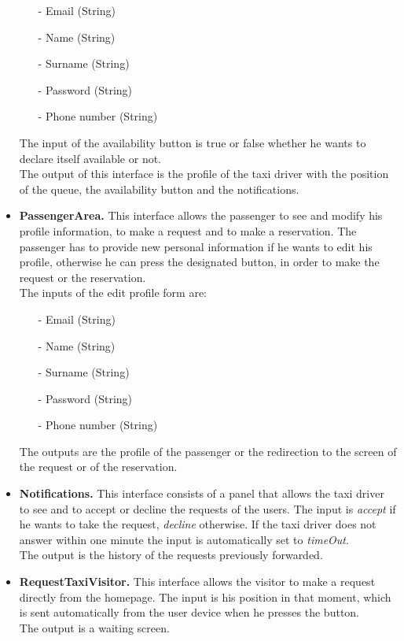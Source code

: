 \begin{itemize}
		\begin{itemize} 
			\item[-] Email (String)
			\item[-] Name (String)
			\item[-] Surname (String)
			\item[-] Password (String)
			\item[-] Phone number (String)
		\end{itemize}
		The input of the availability button is true or false whether he wants to declare itself available or not.\\The output of this interface is the profile of the taxi driver with the position of the queue, the availability button and the notifications.
		\item \textbf{PassengerArea.}
		This interface allows the passenger to see and modify his profile information, to make a request and to make a reservation. The passenger has to provide new personal information if he wants to edit his profile, otherwise he can press the designated button, in order to make the request or the reservation.\\ The inputs of the edit profile form are:
		\begin{itemize} 
			\item[-] Email (String)
			\item[-] Name (String)
			\item[-] Surname (String)
			\item[-] Password (String)
			\item[-] Phone number (String)
		\end{itemize}
		The outputs are the profile of the passenger or the redirection to the screen of the request or of the reservation.
		\item \textbf{Notifications.}
		This interface consists of a panel that allows the taxi driver to see and to accept or decline the requests of the users. The input is \textit{accept} if he wants to take the request, \textit{decline} otherwise. If the taxi driver does not answer within one minute the input is automatically set to \textit{timeOut}.\\ The output is the history of the requests previously forwarded.
		\item \textbf{RequestTaxiVisitor.}
		This interface allows the visitor to make a request directly from the homepage. The input is his position in that moment, which is sent automatically from the user device when he presses the button.\\ The output is a waiting screen.

\end{itemize}

